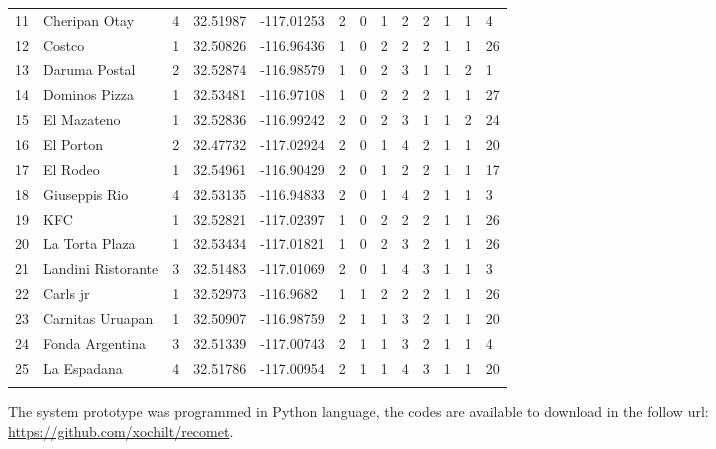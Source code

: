 \begin{table}
\begin{tabular}{lllllllllllll}
11  &   Cheripan Otay   &   4   &   32.51987    &   -117.01253  &   2   &   0   &   1   &   2   &   2   &   1   &   1   &   4   \\
12  &   Costco  &   1   &   32.50826    &   -116.96436  &   1   &   0   &   2   &   2   &   2   &   1   &   1   &   26  \\
13  &   Daruma Postal   &   2   &   32.52874    &   -116.98579  &   1   &   0   &   2   &   3   &   1   &   1   &   2   &   1   \\
14  &   Dominos Pizza   &   1   &   32.53481    &   -116.97108  &   1   &   0   &   2   &   2   &   2   &   1   &   1   &   27  \\
15  &   El Mazateno &   1   &   32.52836    &   -116.99242  &   2   &   0   &   2   &   3   &   1   &   1   &   2   &   24  \\
16  &   El Porton   &   2   &   32.47732    &   -117.02924  &   2   &   0   &   1   &   4   &   2   &   1   &   1   &   20  \\
17  &   El Rodeo    &   1   &   32.54961    &   -116.90429  &   2   &   0   &   1   &   2   &   2   &   1   &   1   &   17  \\
18  &   Giuseppis Rio   &   4   &   32.53135    &   -116.94833  &   2   &   0   &   1   &   4   &   2   &   1   &   1   &   3   \\
19  &   KFC     &   1   &   32.52821    &   -117.02397  &   1   &   0   &   2   &   2   &   2   &   1   &   1   &   26  \\
20  &   La Torta Plaza  &   1   &   32.53434    &   -117.01821  &   1   &   0   &   2   &   3   &   2   &   1   &   1   &   26  \\
21  &   Landini Ristorante  &   3  &   32.51483   &   -117.01069  &   2   &   0   &   1   &   4   &   3   &   1   &   1   &   3   \\
22  &   Carls jr    &   1   &   32.52973    &   -116.9682   &   1   &   1   &   2   &   2   &   2   &   1   &   1   &   26  \\
23  &   Carnitas Uruapan  &   1   &   32.50907  &   -116.98759  &   2   &   1   &   1   &   3   &   2   &   1   &   1   &   20  \\
24  &   Fonda Argentina &   3   &   32.51339    &   -117.00743  &   2   &   1   &   1   &   3   &   2   &   1   &   1   &   4   \\
25  &   La Espadana &   4   &   32.51786    &   -117.00954  &   2   &   1   &   1   &   4   &   3   &   1   &   1   &   20  \\
\noalign{\smallskip}\hline
\end{tabular}
\end{table}
The system prototype was programmed in Python language, 
the codes are available to download in the follow url:
\url{https://github.com/xochilt/recomet}.
